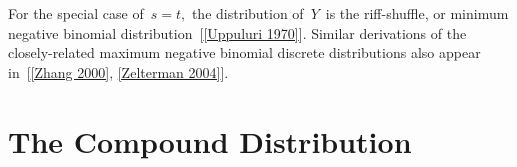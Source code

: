 \documentclass[12pt]{article}         %
\begin{document}
For the special case of $\,s=t,$ the distribution of $\,Y\,$ is the riff-shuffle, or minimum negative binomial distribution~[\ref{Uppuluri 1970}].
Similar derivations of the closely-related maximum negative binomial discrete distributions also appear in~[\ref{Zhang 2000}, \ref{Zelterman 2004}].



\section{The Compound Distribution}


\end{document}
